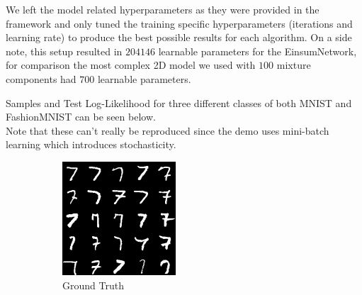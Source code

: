 We left the model related hyperparameters as they were provided in the framework and only tuned the training specific hyperparameters 
(iterations and learning rate) to produce the best possible results for each algorithm. 
On a side note, this setup resulted in $204146$ learnable parameters for the EinsumNetwork, for comparison the most 
complex 2D model we used with $100$ mixture components had $700$ learnable parameters. 

Samples and Test Log-Likelihood for three different classes of both MNIST and FashionMNIST can be seen below. \\
Note that these can't really be reproduced since the demo uses mini-batch learning which introduces stochasticity. 

\begin{figure}[H]
    \centering
    \begin{subfigure}[b]{0.24\textwidth}
        \centering
        \includegraphics[width=\textwidth]{figures/einsum/7mnist_ground_truth.png}
        \caption{Ground Truth}
    \end{subfigure}
    \begin{subfigure}[b]{0.24\textwidth}
        \centering

\end{subfigure}
\end{figure}
